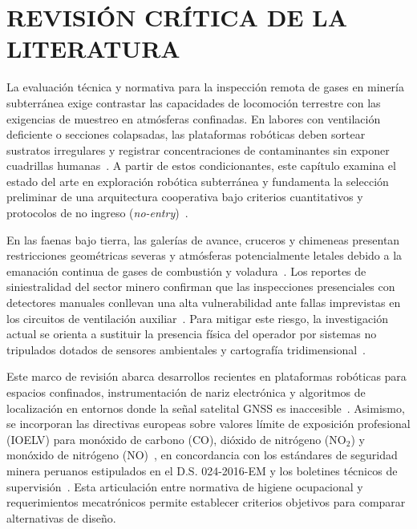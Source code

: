\chapter{REVISIÓN CRÍTICA DE LA LITERATURA}

La evaluación técnica y normativa para la inspección remota de gases en minería subterránea exige contrastar las capacidades de locomoción terrestre con las exigencias de muestreo en atmósferas confinadas. En labores con ventilación deficiente o secciones colapsadas, las plataformas robóticas deben sortear sustratos irregulares y registrar concentraciones de contaminantes sin exponer cuadrillas humanas~\cite{CruzUlloa2024_Nose, PutraWidodo2023_Hexapod, Obosu2025_Automation}. A partir de estos condicionantes, este capítulo examina el estado del arte en exploración robótica subterránea y fundamenta la selección preliminar de una arquitectura cooperativa bajo criterios cuantitativos y protocolos de no ingreso (\textit{no-entry})~\cite{KimChoi_2025_MineMapping}.

En las faenas bajo tierra, las galerías de avance, cruceros y chimeneas presentan restricciones geométricas severas y atmósferas potencialmente letales debido a la emanación continua de gases de combustión y voladura~\cite{CruzUlloa2024_Nose, PutraWidodo2023_Hexapod}. Los reportes de siniestralidad del sector minero confirman que las inspecciones presenciales con detectores manuales conllevan una alta vulnerabilidad ante fallas imprevistas en los circuitos de ventilación auxiliar~\cite{Obosu2025_Automation, Wang2022_Energies_Hexapod}. Para mitigar este riesgo, la investigación actual se orienta a sustituir la presencia física del operador por sistemas no tripulados dotados de sensores ambientales y cartografía tridimensional~\cite{KimChoi_2025_MineMapping}.

Este marco de revisión abarca desarrollos recientes en plataformas robóticas para espacios confinados, instrumentación de nariz electrónica y algoritmos de localización en entornos donde la señal satelital GNSS es inaccesible~\cite{CruzUlloa2024_Nose}. Asimismo, se incorporan las directivas europeas sobre valores límite de exposición profesional (IOELV) para monóxido de carbono ($\text{CO}$), dióxido de nitrógeno ($\text{NO}_2$) y monóxido de nitrógeno ($\text{NO}$)~\cite{EU_ExposureDirective_2020}, en concordancia con los estándares de seguridad minera peruanos estipulados en el D.S. 024-2016-EM y los boletines técnicos de supervisión~\cite{MINEM_DS024_2016, OSINERGMIN_BoletinGSM_Ventilacion_2020}. Esta articulación entre normativa de higiene ocupacional y requerimientos mecatrónicos permite establecer criterios objetivos para comparar alternativas de diseño.


